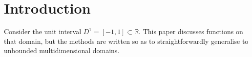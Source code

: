 \documentclass[sigplan,review,anonymous]{acmart}\settopmatter{printfolios=true,printccs=false,printacmref=false}
\theoremstyle{acmplain}
\theoremstyle{acmdefinition}
\begin{document}


\maketitle


\section{Introduction}

Consider the unit interval $D^1 = [-1,1] \subset \mathbb{R}$.
This paper discusses functions on that domain, but the methods are written so as to straightforwardly generalise to unbounded multidimensional domains.
\end{document}
